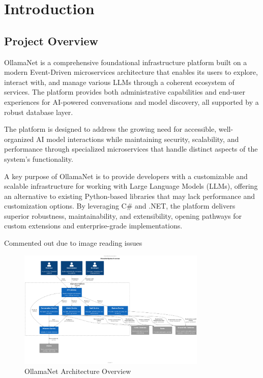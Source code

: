 \def\chapdir{./ChapterIntro}

\chapter{Introduction} \label{ch:intro}

\section{Project Overview}

OllamaNet is a comprehensive foundational infrastructure platform built on a modern Event-Driven microservices architecture that enables its users to explore, interact with, and manage various LLMs through a coherent ecosystem of services. The platform provides both administrative capabilities and end-user experiences for AI-powered conversations and model discovery, all supported by a robust database layer.

The platform is designed to address the growing need for accessible, well-organized AI model interactions while maintaining security, scalability, and performance through specialized microservices that handle distinct aspects of the system's functionality.

A key purpose of OllamaNet is to provide developers with a customizable and scalable infrastructure for working with Large Language Models (LLMs), offering an alternative to existing Python-based libraries that may lack performance and customization options. By leveraging C\# and .NET, the platform delivers superior robustness, maintainability, and extensibility, opening pathways for custom extensions and enterprise-grade implementations.

Commented out due to image reading issues
\begin{figure}
    \centering
    \includegraphics[width=0.8\textwidth]{./Chapter01/figures/OllamaNet_System_Overview.png}
    \caption{OllamaNet Architecture Overview}
    \label{fig:ollamanet-architecture}
\end{figure}

